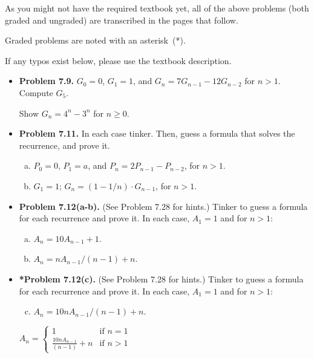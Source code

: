\documentclass[11pt]{article}
\begin{document}
As you might not have the required textbook yet,
all of the above problems (both graded and ungraded)
are transcribed in the pages that follow.

Graded problems are noted with an asterisk~(*).

If any typos exist below, please use the textbook description.

\newpage
\begin{itemize}

\item \textbf{Problem 7.9.}
$G_0=0$, $G_1=1$, and $G_n=7G_{n-1}-12G_{n-2}$ for $n>1$.
Compute $G_5$.

Show $G_n=4^n-3^n$ for $n\ge 0$.

\vspace{0.1in}

\item \textbf{Problem 7.11.}
In each case tinker.
Then, guess a formula that solves the recurrence, and prove it.
\begin{enumerate}[(a)]
\item $P_0=0$, $P_1=a$, and $P_n=2P_{n-1}-P_{n-2}$, for $n>1$.
\item $G_1=1$; $G_n=(1-1/n)\cdot G_{n-1}$, for $n>1$.
\end{enumerate}

\vspace{0.1in}

\item \textbf{Problem 7.12(a-b).} (See Problem 7.28 for hints.)
Tinker to guess a formula for each recurrence and prove it.
In each case, $A_1=1$ and for $n>1$:
\begin{enumerate}[(a)]
\item $A_n=10A_{n-1}+1$.
\item $A_n=nA_{n-1}/(n-1)+n$.
\end{enumerate}

\vspace{0.1in}

\item \textbf{*Problem 7.12(c).} (See Problem 7.28 for hints.)
Tinker to guess a formula for each recurrence and prove it.
In each case, $A_1=1$ and for $n>1$:
\begin{enumerate}[(a)]
\setcounter{enumi}{2}
\item $A_n=10nA_{n-1}/(n-1)+n$.
\end{enumerate}

$ A_n = 
\begin{cases}
  1 & \text{if } n = 1 \\
  \frac{10nA_{n-1}}{(n-1)} + n & \text{if } n > 1
\end{cases}
$


\end{itemize}
\end{document}
